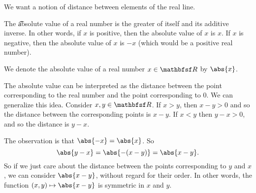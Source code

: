 

We want a notion of distance between elements of the real line.


The \t{absolute value} of a real number is the greater of itself and its additive inverse.
In other words, if $x$ is positive, then the absolute value of $x$ is $x$.
If $x$ is negative, then the absolute value of $x$ is $-x$ (which would be a positive real number).


We denote the absolute value of a real number $x \in \R$ by $\abs{x}$.


The absolute value can be interpreted as the distance between the point corresponding to the real number and the point corresponding to 0.
We can generalize this idea.
Consider  $x, y \in \R$.
If $x > y$, then $x - y > 0$ and so the distance between the corresponding points is $x - y$.
If $x < y$ then $y - x > 0$, and so the distance is $y - x$.

The observation is that $\abs{-x} = \abs{x}$.
So
\[
  \abs{y - x} = \abs{-(x - y)} = \abs{x-y}.
\]
So if we just care about the distance between the points corresponding to $y$ and $x$, we can consider $\abs{x - y}$, without regard for their order.
In other words, the function $(x, y) \mapsto \abs{x - y}$ is symmetric in $x$ and $y$.

\blankpage
